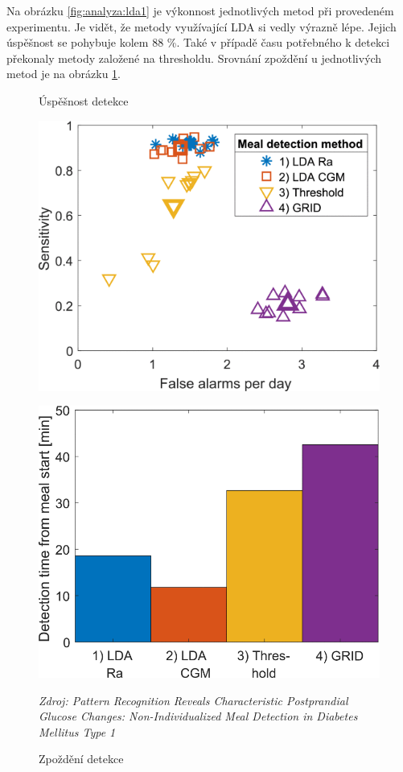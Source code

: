 Na obrázku \ref{fig:analyza:lda1} je výkonnost jednotlivých metod při provedeném experimentu. Je vidět, že metody využívající LDA si vedly výrazně lépe. Jejich úspěšnost se pohybuje kolem 88 \%. Také v případě času potřebného k detekci překonaly metody založené na thresholdu. Srovnání zpoždění u jednotlivých metod je na obrázku \ref{fig:analyza:lda2}.

\begin{figure}[H]
\begin{minipage}{.5\textwidth}
\caption{Úspěšnost detekce}
\label{fig:analyza:lda1}
\centering
\includegraphics[width=1\textwidth]{img/analyzaCHO/lda1.png}\\
\end{minipage}
\begin{minipage}{.5\textwidth}
\caption{Zpoždění detekce}
\label{fig:analyza:lda2}
\centering
\includegraphics[width=1\textwidth]{img/analyzaCHO/lda2.png}\\
\end{minipage}
\textit{Zdroj: Pattern Recognition Reveals Characteristic Postprandial Glucose Changes: Non-Individualized Meal Detection in Diabetes Mellitus Type 1 \citep{analyzaCHO.LDA}}
\end{figure}


